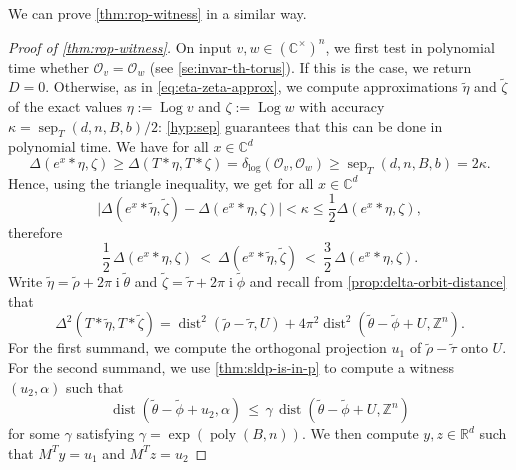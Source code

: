 \documentclass[a4paper,USenglish,cleveref,numberwithinsect]{lipics-v2021}
\DeclareMathOperator{\poly}{poly}
\DeclareMathOperator{\sep}{sep}
\DeclareMathOperator{\ii}{i}
\DeclareMathOperator{\Log}{Log}
\DeclareMathOperator{\dist}{dist}
\newcommand{\distLD}{\delta_{\log}}
\newcommand{\QQ}{\mathbb{Q}}
\newcommand{\CC}{\mathbb{C}}
\newcommand{\ZZ}{\mathbb{Z}}
\newcommand{\RR}{\mathbb{R}}
\newcommand{\OO}{\ensuremath{\mathcal{O}}}
\numberwithin{equation}{section}
\begin{document}
We can prove \cref{thm:rop-witness} in a similar way.

\begin{proof}[Proof of \cref{thm:rop-witness}]
On input $v,w\in (\CC^\times)^n$,
we first test in polynomial time whether $\OO_v=\OO_w$
(see \cref{se:invar-th-torus}). %
If this is the case, we return $D=0$.
Otherwise, as in \cref{eq:eta-zeta-approx},
we compute approximations
$\tilde{\eta}$ and $\tilde{\zeta}$ of the exact values
$\eta:=\Log v$ and $\zeta:=\Log w$
with accuracy $\kappa=\sep_T(d,n,B,b)/2$:
\cref{hyp:sep}
guarantees that this can be done in
polynomial time.
We have for all $x\in\CC^d$
\[
 \Delta(e^x\ast\eta,\zeta)\geq \Delta(T\ast\eta,T\ast\zeta)=\distLD(\OO_v,\OO_w)\geq\sep_T(d,n,B,b)=2\kappa.
\]
Hence, using the triangle inequality, we get  for all $x\in\CC^d$
\begin{equation*}
  \Big| \Delta(e^x\ast \tilde{\eta}, \tilde{\zeta})  - \Delta(e^x\ast \eta, \zeta) \Big| < \kappa \leq \frac12\Delta(e^x\ast \eta, \zeta) ,
\end{equation*}
therefore
\begin{equation}\label{eq:required-ineqs}
 \frac{1}{2}\, \Delta(e^x\ast \eta, \zeta)  \ <\  \Delta(e^x\ast\tilde{\eta},\tilde{\zeta})\   <\  \frac{3}{2}\, \Delta(e^x\ast \eta, \zeta) .
\end{equation}
Write $\tilde{\eta}=\tilde{\rho}+2\pi\ii\tilde{\theta}$ and $\tilde{\zeta}=\tilde{\tau}+2\pi\ii\tilde{\phi}$ and
recall from \cref{prop:delta-orbit-distance} that
$$
 \Delta^2(T\ast\tilde{\eta},T\ast\tilde{\zeta})
      =\dist^2(\tilde{\rho} -\tilde{\tau}, U)
     + 4\pi^2\dist^2 (\tilde{\theta} -\tilde{\phi} + U,\ZZ^n) .
$$
For the first summand,
we compute the orthogonal projection $u_1$ of $\tilde{\rho} -\tilde{\tau}$ onto $U$.
For the second summand, we use \cref{thm:sldp-is-in-p}
to compute a witness $(u_2,\alpha)$ such that
\begin{equation}\label{eq:dada}
  \dist(\tilde{\theta} -\tilde{\phi} + u_2, \alpha) \,
   \leq \, \gamma\, \dist(\tilde{\theta} -\tilde{\phi}+ U, \ZZ^n)
\end{equation}
for some $\gamma$ satisfying $\gamma=\exp(\poly(B,n))$.
We then compute $y,z\in\RR^d$ such that $M^Ty=u_1$ and $M^Tz=u_2$

\end{proof}
\end{document}
